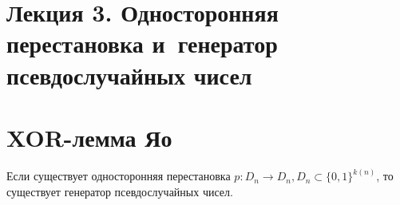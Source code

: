 \documentclass{article}
\begin{document}
\section*{Лекция 3. Односторонняя перестановка и~генератор псевдослучайных
чисел}
\resetcntrs

\section{XOR-лемма Яо}

\begin{theorem}
	Если существует односторонняя перестановка $p: D_n \rightarrow D_n, D_n
	\subset \{0, 1\}^{k(n)} $, то существует генератор псевдослучайных чисел.
\end{theorem}
\end{document}
